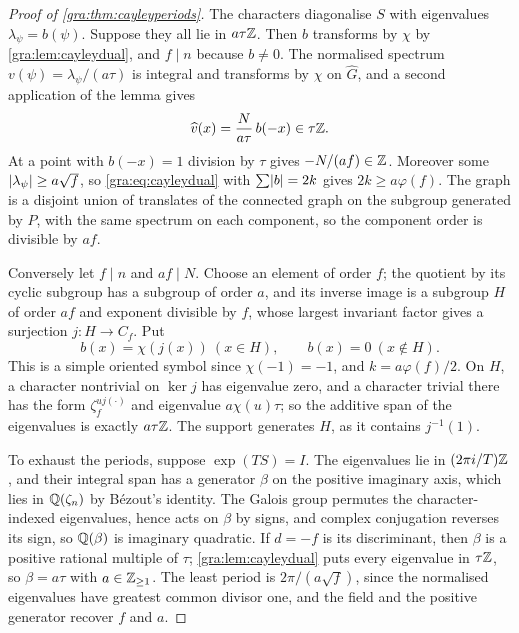\begin{proof}[Proof of \cref{gra:thm:cayleyperiods}]
The characters diagonalise $S$ with eigenvalues $\lambda_\psi=\widehat
b(\psi)$. Suppose they all lie in $a\tau\mathbb{Z}$. Then $b$ transforms by $\chi$
by \cref{gra:lem:cayleydual}, and $f\mid n$ because $b\ne0$. The normalised
spectrum $v(\psi)=\lambda_\psi/(a\tau)$ is integral and transforms by $\chi$
on $\widehat G$, and a second application of the lemma gives
\begin{equation}\label{gra:eq:bidual}
 \widehat v(x)=\frac N{a\tau}\,b(-x)\in\tau\mathbb{Z} .
\end{equation}
At a point with $b(-x)=1$ division by $\tau$ gives $-N/(af)\in\mathbb{Z}$.
Moreover some $\lvert\lambda_\psi\rvert\ge a\sqrt f$, so
\eqref{gra:eq:cayleydual} with $\sum\lvert b\rvert=2k$ gives $2k\ge a\varphi(f)$.
The graph is a disjoint union of translates of the connected graph on the
subgroup generated by $P$, with the same spectrum on each component, so
the component order is divisible by $af$.

Conversely let $f\mid n$ and $af\mid N$. Choose an element of order $f$;
the quotient by its cyclic subgroup has a subgroup of order $a$, and its
inverse image is a subgroup $H$ of order $af$ and exponent divisible by
$f$, whose largest invariant factor gives a surjection $j:H\to C_f$. Put
\begin{equation}\label{gra:eq:cayleyconstruct}
 b(x)=\chi(j(x))\ (x\in H),\qquad b(x)=0\ (x\notin H).
\end{equation}
This is a simple oriented symbol since $\chi(-1)=-1$, and
$k=a\varphi(f)/2$. On $H$, a character nontrivial on $\ker j$ has
eigenvalue zero, and a character trivial there has the form
$\zeta_f^{uj(\cdot)}$ and eigenvalue $a\chi(u)\tau$; so the additive span of
the eigenvalues is exactly $a\tau\mathbb{Z}$. The support generates $H$, as it
contains $j^{-1}(1)$.

To exhaust the periods, suppose $\exp(TS)=I$. The eigenvalues lie in
$(2\pi i/T)\mathbb{Z}$, and their integral span has a generator $\beta$ on the
positive imaginary axis, which lies in $\mathbb{Q}(\zeta_n)$ by B\'ezout's
identity. The Galois group permutes the character-indexed eigenvalues,
hence acts on $\beta$ by signs, and complex conjugation reverses its sign,
so $\mathbb{Q}(\beta)$ is imaginary quadratic. If $d=-f$ is its discriminant, then
$\beta$ is a positive rational multiple of $\tau$; \cref{gra:lem:cayleydual}
puts every eigenvalue in $\tau\mathbb{Z}$, so $\beta=a\tau$ with $a\in\mathbb{Z}_{\ge1}$.
The least period is $2\pi/(a\sqrt f)$, since the normalised eigenvalues
have greatest common divisor one, and the field and the positive generator
recover $f$ and $a$.
\end{proof}


